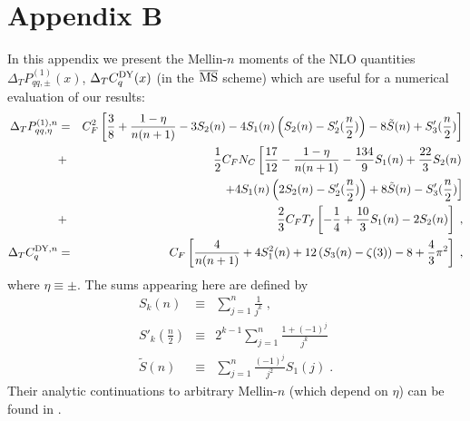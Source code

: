\section*{Appendix B}
\appendix
\setcounter{equation}{0}
\renewcommand{\theequation}{B.\arabic{equation}}
In this appendix we present the Mellin-$n$ moments of the NLO quantities
$\Delta_T P_{qq,\pm}^{(1)} (x)$, $\Delta_T C_q^{{\small {\rm DY}}} (x)$
(in the $\overline{{\mbox{\rm MS}}}$ scheme) which are useful for a numerical 
evaluation of our results:
\begin{eqnarray}
\Delta_T P_{qq,\eta}^{(1),n} &=& C_F^2 \left[ \frac{3}{8} + 
\frac{1-\eta}{n (n+1)} - 3 S_2 (n) - 4 S_1 (n) \left( S_2 (n) - 
S'_2 (\frac{n}{2}) \right) - 8 \tilde{S}(n) + S'_3 (\frac{n}{2}) \right]
\nonumber \\
&+& \frac{1}{2} C_F N_C \left[ \frac{17}{12} - \frac{1-\eta}{n (n+1)}
- \frac{134}{9} S_1 (n) + \frac{22}{3} S_2 (n) \right. \nonumber \\
&&\left. + 4 S_1 (n) \left( 2 S_2 (n) - S'_2 (\frac{n}{2}) \right)
+ 8 \tilde{S}(n) - S'_3 (\frac{n}{2}) \right] \nonumber \\
&+& \frac{2}{3} C_F T_f \left[ - \frac{1}{4} + \frac{10}{3} S_1 (n) - 
2 S_2 (n) \right] \; , \\
\Delta_T C_q^{{\small {\rm DY}},n} &=& C_F \left[ \frac{4}{n(n+1)}
+ 4 S_1^2 (n) + 12 \left( S_3 (n) - \zeta (3) \right) - 8 + 
\frac{4}{3} \pi^2 \right] \; ,
\end{eqnarray} 
where $\eta\equiv\pm$. The sums appearing here are defined by
\begin{eqnarray}
S_k (n) &\equiv& \sum_{j=1}^n \frac{1}{j^k} \nonumber \; , \\
S'_k (\frac{n}{2}) &\equiv& 2^{k-1} \sum_{j=1}^n \frac{1+(-1)^j}{j^k}
\nonumber \; \\
\tilde{S} (n) &\equiv& \sum_{j=1}^n \frac{(-1)^j}{j^2} S_1 (j) \; .
\end{eqnarray}
Their analytic continuations to arbitrary Mellin-$n$ (which depend on 
$\eta$) can be found in \cite{grv}.
\newpage
